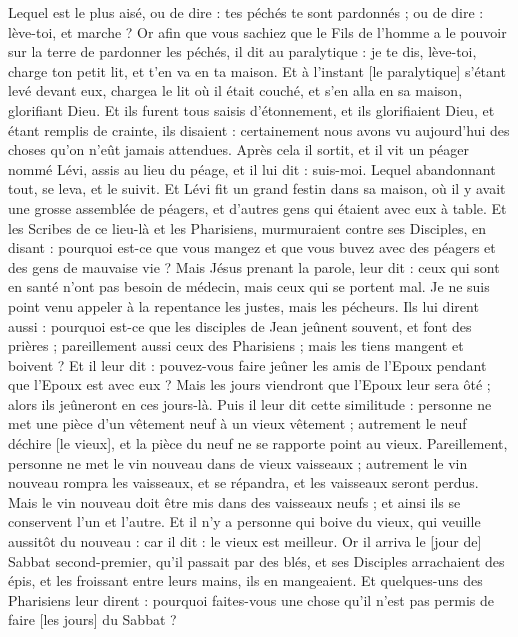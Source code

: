 \begin{multicols}{2}
Lequel est le plus aisé, ou de dire : tes péchés te sont pardonnés ; ou de dire : lève-toi, et marche ?
Or afin que vous sachiez que le Fils de l'homme a le pouvoir sur la terre de pardonner les péchés, il dit au paralytique : je te dis, lève-toi, charge ton petit lit, et t'en va en ta maison.
Et à l'instant [le paralytique] s'étant levé devant eux, chargea le lit où il était couché, et s'en alla en sa maison, glorifiant Dieu.
Et ils furent tous saisis d'étonnement, et ils glorifiaient Dieu, et étant remplis de crainte, ils disaient : certainement nous avons vu aujourd'hui des choses qu'on n'eût jamais attendues.
Après cela il sortit, et il vit un péager nommé Lévi, assis au lieu du péage, et il lui dit : suis-moi.
Lequel abandonnant tout, se leva, et le suivit.
Et Lévi fit un grand festin dans sa maison, où il y avait une grosse assemblée de péagers, et d'autres gens qui étaient avec eux à table.
Et les Scribes de ce lieu-là et les Pharisiens, murmuraient contre ses Disciples, en disant : pourquoi est-ce que vous mangez et que vous buvez avec des péagers et des gens de mauvaise vie ?
Mais Jésus prenant la parole, leur dit : ceux qui sont en santé n'ont pas besoin de médecin, mais ceux qui se portent mal.
Je ne suis point venu appeler à la repentance les justes, mais les pécheurs.
Ils lui dirent aussi : pourquoi est-ce que les disciples de Jean jeûnent souvent, et font des prières ; pareillement aussi ceux des Pharisiens ; mais les tiens mangent et boivent ?
Et il leur dit : pouvez-vous faire jeûner les amis de l'Epoux pendant que l'Epoux est avec eux ?
Mais les jours viendront que l'Epoux leur sera ôté ; alors ils jeûneront en ces jours-là.
Puis il leur dit cette similitude : personne ne met une pièce d'un vêtement neuf à un vieux vêtement ; autrement le neuf déchire [le vieux], et la pièce du neuf ne se rapporte point au vieux.
Pareillement, personne ne met le vin nouveau dans de vieux vaisseaux ; autrement le vin nouveau rompra les vaisseaux, et se répandra, et les vaisseaux seront perdus.
Mais le vin nouveau doit être mis dans des vaisseaux neufs ; et ainsi ils se conservent l'un et l'autre.
Et il n'y a personne qui boive du vieux, qui veuille aussitôt du nouveau : car il dit : le vieux est meilleur.
\VerseOne{}Or il arriva le [jour de] Sabbat second-premier, qu'il passait par des blés, et ses Disciples arrachaient des épis, et les froissant entre leurs mains, ils en mangeaient.
Et quelques-uns des Pharisiens leur dirent : pourquoi faites-vous une chose qu'il n'est pas permis de faire [les jours] du Sabbat ?

\end{multicols}
